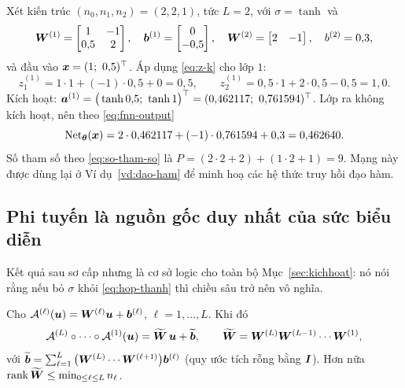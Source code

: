\begin{vidu}
\label{vd:xuoi}
Xét kiến trúc $(n_0,n_1,n_2) = (2,2,1)$, tức $L = 2$, với $\sigma = \tanh$ và
\[
\bm{W}^{(1)} = \begin{bmatrix} 1 & -1 \\ 0{,}5 & 2 \end{bmatrix},
\quad
\bm{b}^{(1)} = \begin{bmatrix} 0 \\ -0{,}5 \end{bmatrix},
\quad
\bm{W}^{(2)} = \begin{bmatrix} 2 & -1 \end{bmatrix},
\quad
b^{(2)} = 0{,}3,
\]
và đầu vào $\bm{x} = (1;\ 0{,}5)^{\top}$. Áp dụng \eqref{eq:z-k} cho lớp $1$:
\[
z^{(1)}_1 = 1\cdot 1 + (-1)\cdot 0{,}5 + 0 = 0{,}5,
\qquad
z^{(1)}_2 = 0{,}5\cdot 1 + 2\cdot 0{,}5 - 0{,}5 = 1{,}0 .
\]
Kích hoạt:
$\ba^{(1)} = \big(\tanh 0{,}5;\ \tanh 1\big)^{\top}
 = (0{,}462117;\ 0{,}761594)^{\top}$.
Lớp ra không kích hoạt, nên theo \eqref{eq:fnn-output}
\[
\operatorname{Net}_{\bm{\theta}}(\bm{x}) = 2\cdot 0{,}462117 + (-1)\cdot 0{,}761594 + 0{,}3
 = 0{,}462640 .
\]
Số tham số theo \eqref{eq:so-tham-so} là
$P = (2\cdot 2 + 2) + (1\cdot 2 + 1) = 9$. Mạng này được dùng lại ở Ví
dụ~\ref{vd:dao-ham} để minh hoạ các hệ thức truy hồi đạo hàm.
\end{vidu}
 
\subsection{Phi tuyến là nguồn gốc duy nhất của sức biểu diễn}
\label{subsec:phi-tuyen}
 
Kết quả sau sơ cấp nhưng là cơ sở logic cho toàn bộ Mục~\ref{sec:kichhoat}: nó
nói rằng nếu bỏ $\sigma$ khỏi \eqref{eq:hop-thanh} thì chiều sâu trở nên vô
nghĩa.
 
\begin{bode}
\label{bd:affine}
Cho $\mathcal{A}^{(\ell)}(\bm{u}) = \bm{W}^{(\ell)}\bm{u} + \bm{b}^{(\ell)}$,
$\ell = 1,\dots,L$. Khi đó
\begin{equation}
\mathcal{A}^{(L)} \circ \cdots \circ \mathcal{A}^{(1)}(\bm{u})
 = \widetilde{\bm{W}}\,\bm{u} + \widetilde{\bm{b}},
\qquad
\widetilde{\bm{W}} = \bm{W}^{(L)}\bm{W}^{(L-1)}\cdots\bm{W}^{(1)},
\label{eq:affine-hop}
\end{equation}
với $\widetilde{\bm{b}} = \sum_{\ell=1}^{L}
\big(\bm{W}^{(L)}\cdots\bm{W}^{(\ell+1)}\big)\bm{b}^{(\ell)}$ (quy ước tích rỗng bằng $\bm{I}$). Hơn nữa $\operatorname{rank} \widetilde{\bm{W}} \le \min_{0\le \ell\le L} n_\ell$.
\end{bode}
 
